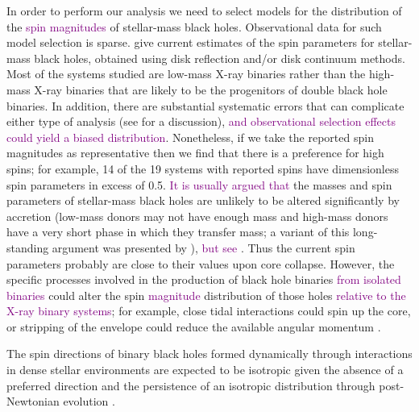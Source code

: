 \documentclass[modern,linenumbers]{aastex61}
\newcommand{\ilya}[1]{\textcolor{purple}{#1}}
\begin{document}
In order to perform our analysis we need to select models for the
distribution of the \ilya{spin magnitudes} of stellar-mass
black holes.  Observational data for such model selection is sparse.
\citet{2015PhR...548....1M} give current estimates of the spin
parameters for stellar-mass black holes, obtained using disk
reflection and/or disk continuum methods.  Most of the systems studied
are low-mass X-ray binaries rather than the high-mass X-ray binaries
that are likely to be the progenitors of double black hole binaries.
In addition, there are substantial systematic errors that can
complicate either type of analysis (see \citealt{2015PhR...548....1M}
for a discussion), \ilya{and observational selection effects could yield a biased distribution}. Nonetheless, if we take the reported spin
magnitudes as representative then we find that there is a preference
for high spins; for example, 14 of the 19 systems with reported spins
have dimensionless spin parameters in excess of 0.5.  \ilya{It is usually argued that} the masses and spin parameters
of stellar-mass black holes are unlikely to be altered significantly
by accretion (low-mass donors may not have enough mass and
high-mass donors have a very short phase in which they transfer mass;
a variant of this long-standing argument was presented by
\citet{1999MNRAS.305..654K}), \ilya{but see \citet{Podsiadlowski:2003,FragosMcClintock:2015}}.  Thus the current spin parameters
probably are close to their values upon core collapse.  However, the
specific processes involved in the production of black hole binaries \ilya{from isolated binaries}
could alter the spin \ilya{magnitude} distribution of those holes \ilya{relative to the X-ray binary systems}; for example, close
tidal interactions could spin up the core, or stripping of the
envelope could reduce the available angular momentum \citep{2016MNRAS.462..844K,Zaldarriaga:2017,HotokezakaPiran:2017}.  

The spin directions of binary black holes formed dynamically through
interactions in dense stellar environments
\citep{SigurdssonHernquist:1993,PZMcMillan:2000,Rodriguez:2015,Stone:2016}
are expected to be isotropic given the absence of a preferred
direction \citep[e.g.,][]{2016ApJ...832L...2R} and the persistence of
an isotropic distribution through post-Newtonian evolution
\citep{2004PhRvD..70l4020S,2007ApJ...661L.147B}.
\end{document}
